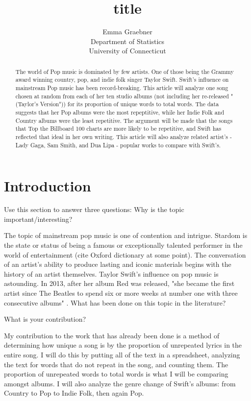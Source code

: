 \documentclass[12pt]{article}
\title{title}
\author{Emma Graebner\\
  Department of Statistics\\
  University of Connecticut
}
\begin{document}
\maketitle

\begin{abstract}
The world of Pop music is dominated by few artists. One of those being the Grammy award winning country, pop, and indie folk singer Taylor Swift. Swift's influence on mainstream Pop music has been record-breaking. This article will analyze one song chosen at random from each of her ten studio albums (not including her re-released "(Taylor's Version")) for its proportion of unique words to total words. The data suggests that her Pop albums were the most repeptitive, while her Indie Folk and Country albums were the least repetitive. The argument will be made that the songs that Top the Billboard 100 charts are more likely to be repetitive, and Swift has reflected that ideal in her own writing. This article will also analyze related artist's - Lady Gaga, Sam Smith, and Dua Lipa - popular works to compare with Swift's.   
\end{abstract}


\section{Introduction}
\label{sec:intro}

Use this section to answer three questions:
Why is the topic important/interesting?

  The topic of mainstream pop music is one of contention and intrigue. Stardom is the state or status of being a famous or exceptionally talented performer in the world of entertainment (cite Oxford dictionary at some point). The conversation of an artist's ability to produce lasting and iconic materials begins with the history of an artist themselves. Taylor Swift's influence on pop music is astounding. In 2013, after her album Red was released, "she became the first artist since The Beatles to spend
  six or more weeks at number one with three consecutive albums" \citet{newkey2014taylor}.
What has been done on this topic in the literature?

What is your contribution?

My contribution to the work that has already been done is a method of determining how unique a song is by the proportion of unrepeated lyrics in the entire song. I will do this by putting all of the text in a spreadsheet, analyzing the text for words that do not repeat in the song, and counting them. The proportion of unrepeated words to total words is what I will be comparing amongst albums.
I will also analyze the genre change of Swift's albums: from Country to Pop to Indie Folk, then again Pop.   
\end{document}
